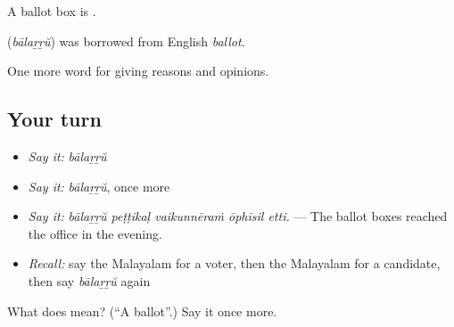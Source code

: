 A ballot box is  .

\begin{cousinweb}
\textbf{} (\emph{bālaṟṟŭ}) was borrowed from English \emph{ballot}.
\end{cousinweb}

\begin{grammarlens}[title={What you've built}]
One more word for giving reasons and opinions.
\end{grammarlens}

\subsection*{Your turn}
\begin{itemize}
\raggedright
  \item \emph{Say it:} \emph{bālaṟṟŭ}
  \item \emph{Say it:} \emph{bālaṟṟŭ}, once more
  \item \emph{Say it:} \emph{bālaṟṟŭ peṭṭikaḷ vaikunnēraṁ ōphīsil etti.} — The ballot boxes reached the office in the evening.
  \item \emph{Recall:} say the Malayalam for a voter, then the Malayalam for a candidate, then say \emph{bālaṟṟŭ} again
\end{itemize}

\begin{tcolorbox}[breakable,colback=teal!4,colframe=teal!35!black,title={Before you move on}]
What does  mean? (\textquotedblleft{}A ballot\textquotedblright{}.) Say it once more.
\end{tcolorbox}
